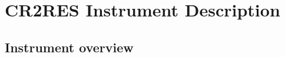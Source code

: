 \section{\label{instrument}CR2RES Instrument Description}




\subsection{\label{instrument:overview}Instrument overview}


\begin{figure}[ht]
\begin{center}
\begin{tabular}{c}
\end{tabular}
\end{center}
\caption{ }
\end{figure}




